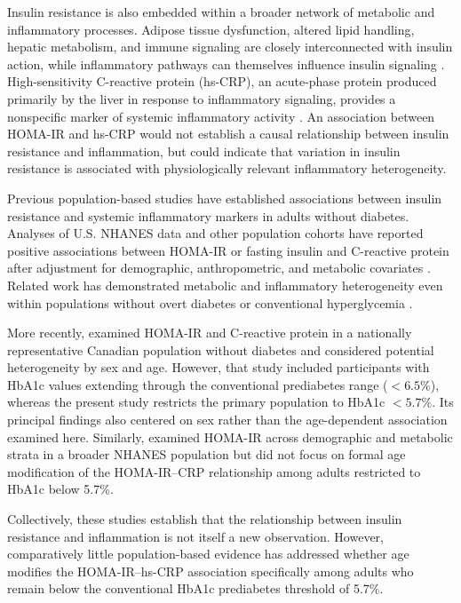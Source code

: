 \documentclass[11pt]{article}
\begin{document}
Insulin resistance is also embedded within a broader network of metabolic
and inflammatory processes. Adipose tissue dysfunction, altered lipid
handling, hepatic metabolism, and immune signaling are closely interconnected
with insulin action, while inflammatory pathways can themselves influence
insulin signaling \citep{Park2014AgingIR,Chen2004,Park2009,Yan2019}.
High-sensitivity C-reactive protein (hs-CRP), an acute-phase protein
produced primarily by the liver in response to inflammatory signaling,
provides a nonspecific marker of systemic inflammatory activity
\citep{Pepys2003}. An association between HOMA-IR and hs-CRP would not
establish a causal relationship between insulin resistance and inflammation,
but could indicate that variation in insulin resistance is associated with
physiologically relevant inflammatory heterogeneity.

Previous population-based studies have established associations between
insulin resistance and systemic inflammatory markers in adults without
diabetes. Analyses of U.S. NHANES data and other population cohorts have
reported positive associations between HOMA-IR or fasting insulin and
C-reactive protein after adjustment for demographic, anthropometric, and
metabolic covariates
\citep{Chen2004,Meng2007,Park2009,Missel2021}.
Related work has demonstrated metabolic and inflammatory heterogeneity even
within populations without overt diabetes or conventional hyperglycemia
\citep{Caporaso2020}.

More recently, \citet{Shahid2023} examined HOMA-IR and C-reactive protein
in a nationally representative Canadian population without diabetes and
considered potential heterogeneity by sex and age. However, that study
included participants with HbA1c values extending through the conventional
prediabetes range ($<6.5\%$), whereas the present study restricts the
primary population to HbA1c $<5.7\%$. Its principal findings also centered
on sex rather than the age-dependent association examined here. Similarly,
\citet{Caporaso2020} examined HOMA-IR across demographic and metabolic
strata in a broader NHANES population but did not focus on formal age
modification of the HOMA-IR--CRP relationship among adults restricted to
HbA1c below 5.7\%.

Collectively, these studies establish that the relationship between insulin
resistance and inflammation is not itself a new observation. However,
comparatively little population-based evidence has addressed whether age
modifies the HOMA-IR--hs-CRP association specifically among adults who
remain below the conventional HbA1c prediabetes threshold of 5.7\%.
\end{document}

